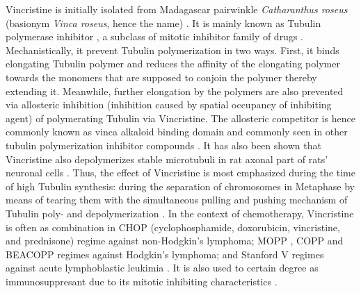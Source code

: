 \documentclass[pdftex,12pt,a4paper]{report}
\begin{document}
Vincristine is initially isolated from Madagascar pairwinkle \textit{Catharanthus roseus} (basionym \textit{Vinca roseus}, hence the name) \cite{nci2018defvincristine}. It is mainly known as Tubulin polymerase inhibitor \cite{tsuruo1982increased}, a subclass of mitotic inhibitor family of drugs \cite{jordan1998tubulin}. Mechanistically, it prevent Tubulin polymerization in two ways. First, it binds elongating Tubulin polymer and reduces the affinity of the elongating polymer \cite{lobert1996interaction} towards the monomers that are supposed to conjoin the polymer thereby extending it. Meanwhile, further elongation by the polymers are also prevented via allosteric inhibition (inhibition caused by spatial occupancy of inhibiting agent) of polymerating Tubulin via Vincristine. The allosteric competitor is hence commonly known as vinca alkaloid binding domain and commonly seen in other tubulin polymerization inhibitor compounds \cite{tsuruo1982increased}. It has also been shown that Vincristine also depolymerizes stable microtubuli in rat axonal part of rats' neuronal cells \cite{jordan1998tubulin}. Thus, the effect of Vincristine is most emphasized during the time of high Tubulin synthesis: during the separation of chromosomes in Metaphase by means of tearing them with the simultaneous pulling and pushing mechanism of Tubulin poly- and depolymerization \cite{owellen1972binding}. In the context of chemotherapy, Vincristine is often as combination in CHOP (cyclophosphamide, doxorubicin, vincristine, and prednisone) regime \cite{hiddemann2005frontline} against non-Hodgkin's lymphoma; MOPP \cite{brandriff1994chromosomal}, COPP \cite{pfreundschuh1987lomustine} and BEACOPP \cite{diehl1998beacopp} regimes against Hodgkin's lymphoma; and Stanford V regimes against acute lymphoblastic leukimia \cite{bartlett1995brief}. It is also used to certain degree as immunosuppresant due to its mitotic inhibiting characteristics \cite{ahn1974vincristine}.
\end{document}
